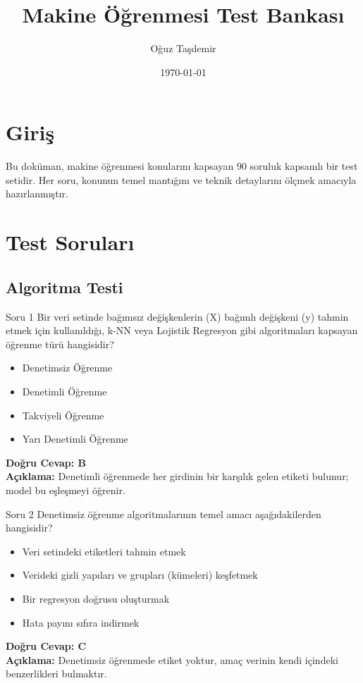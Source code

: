 \documentclass[12pt,a4paper]{article}
\title{\textbf{Makine Öğrenmesi Test Bankası}}
\author{Oğuz Taşdemir}
\date{\today}
\begin{document}
\maketitle
\newpage

\tableofcontents
\newpage

\section{Giriş}
Bu doküman, makine öğrenmesi konularını kapsayan 90 soruluk kapsamlı bir test setidir. Her soru, konunun temel mantığını ve teknik detaylarını ölçmek amacıyla hazırlanmıştır.

\newpage
\section{Test Soruları}

\subsection{Algoritma Testi}

\begin{testcard}{Soru 1}
    Bir veri setinde bağımsız değişkenlerin (X) bağımlı değişkeni (y) tahmin etmek için kullanıldığı, k-NN veya Lojistik Regresyon gibi algoritmaları kapsayan öğrenme türü hangisidir?
    \begin{itemize}
        \item[A)] Denetimsiz Öğrenme
        \item[B)] Denetimli Öğrenme
        \item[C)] Takviyeli Öğrenme
        \item[D)] Yarı Denetimli Öğrenme
    \end{itemize}
    \tcblower
    \textbf{Doğru Cevap: B} \\
    \textbf{Açıklama:} Denetimli öğrenmede her girdinin bir karşılık gelen etiketi bulunur; model bu eşleşmeyi öğrenir.
\end{testcard}

\begin{testcard}{Soru 2}
    Denetimsiz öğrenme algoritmalarının temel amacı aşağıdakilerden hangisidir?
    \begin{itemize}
        \item[A)] Veri setindeki etiketleri tahmin etmek
        \item[B)] Verideki gizli yapıları ve grupları (kümeleri) keşfetmek
        \item[C)] Bir regresyon doğrusu oluşturmak
        \item[D)] Hata payını sıfıra indirmek
    \end{itemize}
    \tcblower
    \textbf{Doğru Cevap: C} \\
    \textbf{Açıklama:} Denetimsiz öğrenmede etiket yoktur, amaç verinin kendi içindeki benzerlikleri bulmaktır.
\end{testcard}
\end{document}
